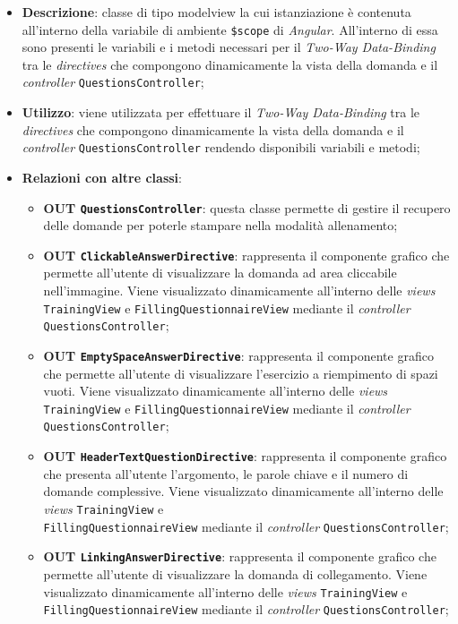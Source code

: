 \begin{itemize}
	\item \textbf{Descrizione}: classe di tipo modelview la cui istanziazione è contenuta all'interno della variabile di ambiente \texttt{\$scope} di \textit{Angular}. All'interno di essa sono presenti le variabili e i metodi necessari per il \textit{Two-Way Data-Binding} tra le \textit{directives} che compongono dinamicamente la vista della domanda e il \textit{controller} \texttt{QuestionsController};
	\item \textbf{Utilizzo}: viene utilizzata per effettuare il \textit{Two-Way Data-Binding} tra le \textit{directives} che compongono dinamicamente la vista della domanda e il \textit{controller} \texttt{QuestionsController} rendendo disponibili variabili e metodi;
	\item \textbf{Relazioni con altre classi}: 
	\begin{itemize} 
		\item \textbf{OUT \texttt{QuestionsController}}: questa classe permette di gestire il recupero delle domande per poterle stampare nella modalità allenamento;
		\item \textbf{OUT \texttt{ClickableAnswerDirective}}: rappresenta il componente grafico che permette all'utente di visualizzare la domanda ad area cliccabile nell'immagine. Viene visualizzato dinamicamente all'interno delle \textit{views} \texttt{TrainingView} e \texttt{FillingQuestionnaireView} mediante il \textit{controller} \texttt{QuestionsController};
		\item \textbf{OUT \texttt{EmptySpaceAnswerDirective}}: rappresenta il componente grafico che permette all'utente di visualizzare l'esercizio a riempimento di spazi vuoti. Viene visualizzato dinamicamente all'interno delle \textit{views} \texttt{TrainingView} e \texttt{FillingQuestionnaireView} mediante il \textit{controller} \texttt{QuestionsController};
		\item \textbf{OUT \texttt{HeaderTextQuestionDirective}}: rappresenta il componente grafico che presenta all'utente l'argomento, le parole chiave e il numero di domande complessive. Viene visualizzato dinamicamente all'interno delle \textit{views} \texttt{TrainingView} e \\\texttt{FillingQuestionnaireView} mediante il \textit{controller} \texttt{QuestionsController};
		\item \textbf{OUT \texttt{LinkingAnswerDirective}}: rappresenta il componente grafico che permette all'utente di visualizzare la domanda di collegamento. Viene visualizzato dinamicamente all'interno delle \textit{views} \texttt{TrainingView} e \texttt{FillingQuestionnaireView} mediante il \textit{controller} \texttt{QuestionsController};

\end{itemize}
\end{itemize}
